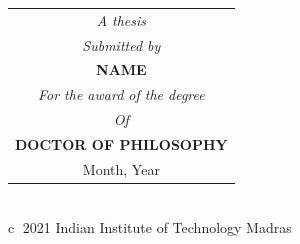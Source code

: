\begin{titlepage}
\begin{tabular}{c}
     
     
     \vspace{-0.25cm}\textit{A thesis}\\
     \vspace{-0.25cm}\textit{Submitted by}\\
     \vspace{2cm}
     \textbf{NAME}\\
     
     
     \vspace{-0.25cm}\textit{For the award of the degree}\\
     \vspace{-0.25cm}\textit{Of}\\
     \vspace{-0.25cm}\textbf{DOCTOR OF PHILOSOPHY}\\
     Month, Year
    
\end{tabular}\\

\textcircled{c} 2021 Indian Institute of Technology Madras

\end{titlepage}